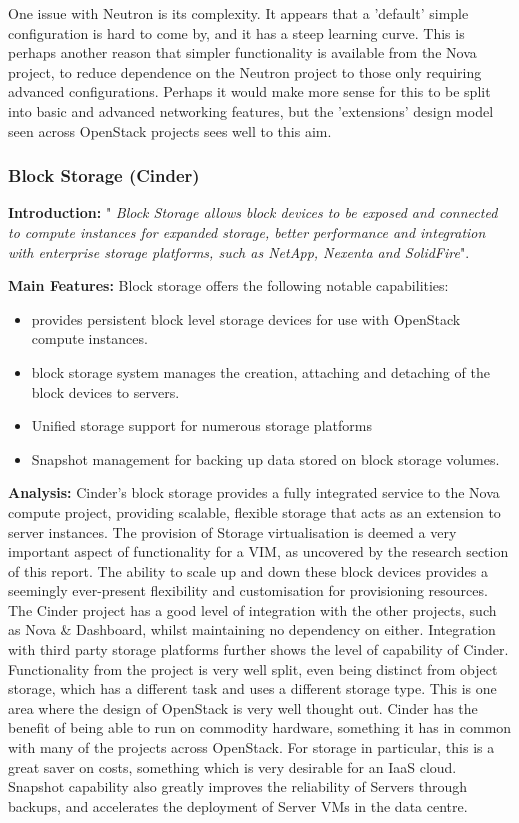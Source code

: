 One issue with Neutron is its complexity. It appears that a 'default' simple configuration is hard to come by, and it has a steep learning curve. This is perhaps another reason that simpler functionality is available from the Nova project, to reduce dependence on the Neutron project to those only requiring advanced configurations. Perhaps it would make more sense for this to be split into basic and advanced networking features, but the 'extensions' design model seen across OpenStack projects sees well to this aim. 

\subsubsection{Block Storage (Cinder)}
\textbf{Introduction:}
 "\textit{ Block Storage allows block devices to be exposed and connected to compute instances for expanded storage, better performance and integration with enterprise storage platforms, such as NetApp, Nexenta and SolidFire}"\cite{openstackstorage}.

\textbf{Main Features:}
Block storage offers the following notable capabilities\cite{openstackstorage}:
\begin{itemize}
\itemsep0em
\item provides persistent block level storage devices for use with OpenStack compute instances.
\item block storage system manages the creation, attaching and detaching of the block devices to servers.
\item Unified storage support for numerous storage platforms 
\item Snapshot management for backing up data stored on block storage volumes. 
\end{itemize}

\textbf{Analysis: }
Cinder's block storage provides a fully integrated service to the Nova compute project, providing scalable, flexible storage that acts as an extension to server instances. The provision of Storage virtualisation is deemed a very important aspect of functionality for a VIM, as uncovered by the research section of this report. The ability to scale up and down these block devices provides a seemingly ever-present flexibility and customisation for provisioning resources.
The Cinder project has a good level of integration with the other projects, such as Nova \& Dashboard, whilst maintaining no dependency on either. Integration with third party storage platforms further shows the level of capability of Cinder. Functionality from the project is very well split, even being distinct from object storage, which has a different task and uses a different storage type. This is one area where the design of OpenStack is very well thought out. 
Cinder has the benefit of being able to run on commodity hardware, something it has in common with many of the projects across OpenStack. For storage in particular, this is a great saver on costs, something which is very desirable for an IaaS cloud. Snapshot capability also greatly improves the reliability of Servers through backups, and accelerates the deployment of Server VMs in the data centre. 
 
